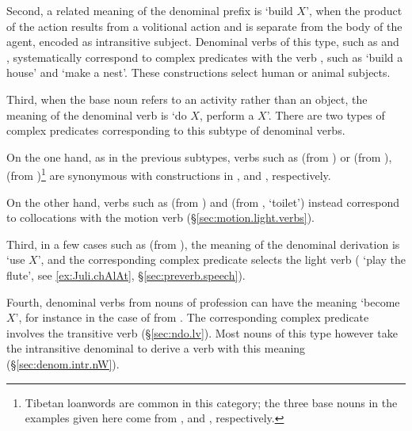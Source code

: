 Second, a related meaning of  the  denominal prefix is `build $X$', when the product of the action results from a volitional action and is separate from the body of the agent, encoded as  
intransitive subject. Denominal verbs of this type, such as  and  ,  systematically correspond to complex predicates with the verb , such as  `build a house' and    `make a nest'. These constructions select human or animal subjects.

Third, when the base noun refers to an activity rather than an object, the meaning of the  denominal verb is `do $X$, perform a $X$'. There are two types of complex predicates corresponding to this subtype of denominal verbs. 

On the one hand, as in the previous subtypes, verbs such as   (from ) or  (from ),  (from )\footnote{Tibetan loanwords are common in this category; the three base nouns in the examples given here come from 
,  and , respectively.} are synonymous with constructions in ,  and , respectively. 

On the other hand, verbs such as   (from ) and  (from  , `toilet') instead correspond to collocations with the motion verb  (§\ref{sec:motion.light.verbs}). 
 
Third, in a few cases such as   (from ), the meaning of the denominal derivation is `use $X$', and the corresponding complex predicate selects the light verb  ( `play the flute', see \ref{ex:Juli.chAlAt}, §\ref{sec:preverb.speech}).
 
 Fourth,  denominal verbs from nouns of profession can have the meaning `become $X$', for instance in the case of  from  . The corresponding complex predicate involves the transitive verb  (§\ref{sec:ndo.lv}). Most nouns of this type however take the intransitive denominal  to derive a verb with this meaning (§\ref{sec:denom.intr.nW}).
 
